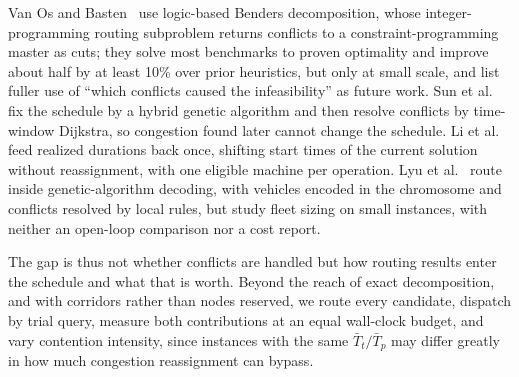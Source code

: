 \documentclass[manuscript,screen,review]{acmart}
\begin{document}
Van Os and Basten~\cite{vanos2026exact} use logic-based Benders decomposition, whose integer-programming routing subproblem returns conflicts to a constraint-programming master as cuts; they solve most benchmarks to proven optimality and improve about half by at least 10\% over prior heuristics, but only at small scale, and list fuller use of ``which conflicts caused the infeasibility'' as future work.
Sun et al.~\cite{sun2023integrated} fix the schedule by a hybrid genetic algorithm and then resolve conflicts by time-window Dijkstra, so congestion found later cannot change the schedule.
Li et al.~\cite{li2026framework} feed realized durations back once, shifting start times of the current solution without reassignment, with one eligible machine per operation.
Lyu et al.~\cite{lyu2019approach} route inside genetic-algorithm decoding, with vehicles encoded in the chromosome and conflicts resolved by local rules, but study fleet sizing on small instances, with neither an open-loop comparison nor a cost report.

The gap is thus not whether conflicts are handled but how routing results enter the schedule and what that is worth.
Beyond the reach of exact decomposition, and with corridors rather than nodes reserved, we route every candidate, dispatch by trial query, measure both contributions at an equal wall-clock budget, and vary contention intensity, since instances with the same $\bar{T}_t/\bar{T}_p$ may differ greatly in how much congestion reassignment can bypass.
\end{document}
